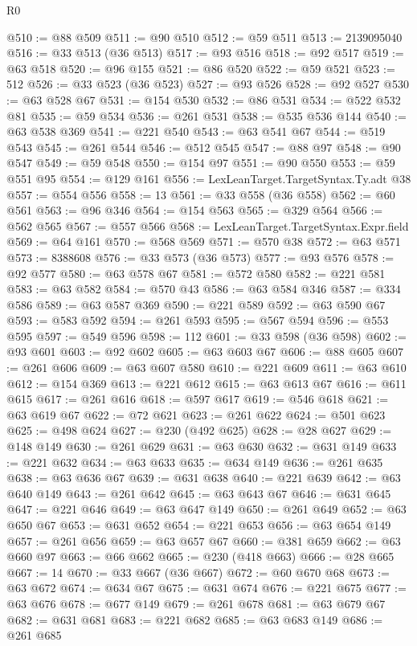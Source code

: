 \begin{lexlean}{R0}
\begin{coremodule}
@510 := @88 @509
@511 := @90 @510
@512 := @59 @511
@513 := 2139095040
@516 := @33 @513 (@36 @513)
@517 := @93 @516
@518 := @92 @517
@519 := @63 @518
@520 := @96 @155
@521 := @86 @520
@522 := @59 @521
@523 := 512
@526 := @33 @523 (@36 @523)
@527 := @93 @526
@528 := @92 @527
@530 := @63 @528 @67
@531 := @154 @530
@532 := @86 @531
@534 := @522 @532 @81
@535 := @59 @534
@536 := @261 @531
@538 := @535 @536 @144
@540 := @63 @538 @369
@541 := @221 @540
@543 := @63 @541 @67
@544 := @519 @543
@545 := @261 @544
@546 := @512 @545
@547 := @88 @97
@548 := @90 @547
@549 := @59 @548
@550 := @154 @97
@551 := @90 @550
@553 := @59 @551 @95
@554 := @129 @161
@556 := LexLeanTarget.TargetSyntax.Ty.adt @38
@557 := @554 @556
@558 := 13
@561 := @33 @558 (@36 @558)
@562 := @60 @561
@563 := @96 @346
@564 := @154 @563
@565 := @329 @564
@566 := @562 @565
@567 := @557 @566
@568 := LexLeanTarget.TargetSyntax.Expr.field
@569 := @64 @161
@570 := @568 @569
@571 := @570 @38
@572 := @63 @571
@573 := 8388608
@576 := @33 @573 (@36 @573)
@577 := @93 @576
@578 := @92 @577
@580 := @63 @578 @67
@581 := @572 @580
@582 := @221 @581
@583 := @63 @582
@584 := @570 @43
@586 := @63 @584 @346
@587 := @334 @586
@589 := @63 @587 @369
@590 := @221 @589
@592 := @63 @590 @67
@593 := @583 @592
@594 := @261 @593
@595 := @567 @594
@596 := @553 @595
@597 := @549 @596
@598 := 112
@601 := @33 @598 (@36 @598)
@602 := @93 @601
@603 := @92 @602
@605 := @63 @603 @67
@606 := @88 @605
@607 := @261 @606
@609 := @63 @607 @580
@610 := @221 @609
@611 := @63 @610
@612 := @154 @369
@613 := @221 @612
@615 := @63 @613 @67
@616 := @611 @615
@617 := @261 @616
@618 := @597 @617
@619 := @546 @618
@621 := @63 @619 @67
@622 := @72 @621
@623 := @261 @622
@624 := @501 @623
@625 := @498 @624
@627 := @230 (@492 @625)
@628 := @28 @627
@629 := @148 @149
@630 := @261 @629
@631 := @63 @630
@632 := @631 @149
@633 := @221 @632
@634 := @63 @633
@635 := @634 @149
@636 := @261 @635
@638 := @63 @636 @67
@639 := @631 @638
@640 := @221 @639
@642 := @63 @640 @149
@643 := @261 @642
@645 := @63 @643 @67
@646 := @631 @645
@647 := @221 @646
@649 := @63 @647 @149
@650 := @261 @649
@652 := @63 @650 @67
@653 := @631 @652
@654 := @221 @653
@656 := @63 @654 @149
@657 := @261 @656
@659 := @63 @657 @67
@660 := @381 @659
@662 := @63 @660 @97
@663 := @66 @662
@665 := @230 (@418 @663)
@666 := @28 @665
@667 := 14
@670 := @33 @667 (@36 @667)
@672 := @60 @670 @68
@673 := @63 @672
@674 := @634 @67
@675 := @631 @674
@676 := @221 @675
@677 := @63 @676
@678 := @677 @149
@679 := @261 @678
@681 := @63 @679 @67
@682 := @631 @681
@683 := @221 @682
@685 := @63 @683 @149
@686 := @261 @685

\end{coremodule}
\end{lexlean}
